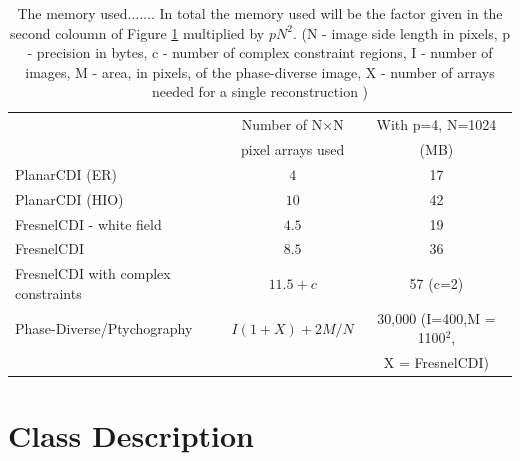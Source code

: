 \documentclass[]{cxs-software}
\begin{document}
\begin{table}[hbt!]
\begin{tabular}[hbt!]{lcc}
\toprule
&  Number of N$\times$N & With p=4, N=1024 \\
&  pixel arrays used & (MB) \\
\midrule
PlanarCDI (ER) & $4$ & 17 \\
PlanarCDI (HIO) & $10$ & 42  \\
FresnelCDI - white field & $4.5$ & 19 \\
FresnelCDI & $8.5$ & 36 \\
FresnelCDI with complex constraints & $11.5+c$ & 57 (c=2) \\
Phase-Diverse/Ptychography & $I(1+X) + 2M/N$ & 30,000 (I=400,M = 1100$^2$, \\
 &                 & X = FresnelCDI)  \\
\bottomrule
\end{tabular}

\caption{\label{table:memory}The memory used.......
In total the memory used will be the factor given in the second
coloumn of Figure \ref{table:memory} multiplied by $pN^2$.
(N - image side length in pixels, p - precision in bytes, 
c - number of complex constraint regions, I - number of images, 
M - area, in pixels, of the phase-diverse image,
X - number of arrays needed for a single reconstruction ) 
}
\end{table}





\appendix


\section{Class Description} 
\end{document}
